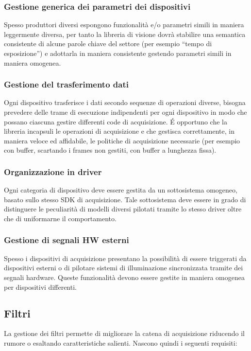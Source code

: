 \subsubsection{Gestione generica dei parametri dei dispositivi}
Spesso produttori diversi espongono funzionalità e/o parametri simili in maniera leggermente diversa, per tanto la libreria di visione dovrà stabilire una semantica consistente di alcune parole chiave del settore (per esempio ``tempo di esposizione'') e adottarla in maniera consistente gestendo parametri simili in maniera omogenea.
\subsubsection{Gestione del trasferimento dati}
Ogni dispositivo trasferisce i dati secondo sequenze di operazioni diverse, bisogna prevedere delle trame di esecuzione indipendenti per ogni dispositivo in modo che possano ciascuna gestire differenti code di acquisizione. \'{E} opportuno che la libreria incapsuli le operazioni di acquisizione e che gestisca correttamente, in maniera veloce ed affidabile, le politiche di acquisizione necessarie (per esempio con buffer, scartando i frames non gestiti, con buffer a lunghezza fissa).
\subsubsection{Organizzazione in driver}
Ogni categoria di dispositivo deve essere gestita da un sottosistema omogeneo, basato sullo stesso SDK di acquisizione. Tale sottosistema deve essere in grado di distinguere le peculiarità di modelli diversi pilotati tramite lo stesso driver oltre che di uniformarne il comportamento.
\subsubsection{Gestione di segnali HW esterni}
Spesso i dispositivi di acquisizione presentano la possibilità di essere triggerati da dispositivi esterni o di pilotare sistemi di illuminazione sincronizzata tramite dei segnali hardware. Queste funzionalità devono essere gestite in maniera omogenea per dispositivi differenti.

\subsection{Filtri}
La gestione dei filtri permette di migliorare la catena di acquisizione riducendo il rumore o esaltando caratteristiche salienti. Nascono quindi i seguenti requisiti:

